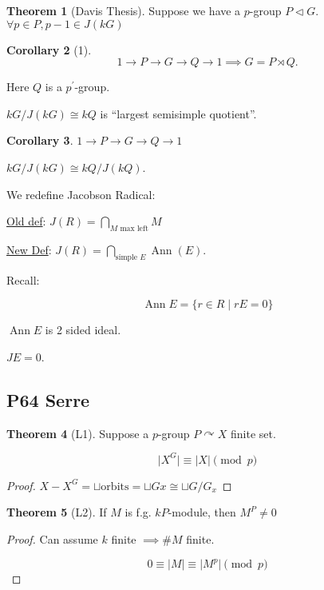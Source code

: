 \documentclass{article}
\theoremstyle{definition}
\newtheorem{theorem}{Theorem}
\newtheorem{corollary}[theorem]{Corollary}
\newcommand{\acts}{\curvearrowright}
\begin{document}
\begin{theorem}
    [Davis Thesis] Suppose we have a \(p\)-group \(P \triangleleft G\). \(\forall p\in P, p-1 \in J(kG)\)
\end{theorem}

\begin{corollary}
    [1]

    \[
        1 \to P \to G \to Q \to 1 \implies G = P \rtimes Q.
    \]

    Here \(Q\) is a \(p^{\prime}\)-group.

    \(kG / J(kG) \cong kQ\) is ``largest semisimple quotient''.
\end{corollary}

\begin{corollary}
    \(1 \to P \to G \to Q \to 1\) 

    \(kG / J(kG) \cong kQ / J(kQ)\).
\end{corollary}

We redefine Jacobson Radical:

\underline{Old def}: \(J(R) = \bigcap_{M \text{ max left} }^{} M\) 

\underline{New Def}: \(J(R) = \bigcap_{\text{simple } E}^{} \operatorname{Ann} (E)\).

Recall:

\[
    \operatorname{Ann} E = \{ r\in R \mid rE = 0 \} 
\]

\(\operatorname{Ann} E\) is 2 sided ideal.

\(JE = 0\).

\subsection*{P64 Serre}

\begin{theorem}
    [L1] Suppose a \(p\)-group \(P \acts X\) finite set.

    \[
        \vert X^G \vert \equiv \vert X \vert \pmod{p}
    \]
\end{theorem}

\begin{proof}
    \(X - X^G = \sqcup \text{orbits} = \sqcup G x \cong \sqcup G / G_x \) 
\end{proof}

\begin{theorem}
    [L2] If \(M\) is f.g. \(kP\)-module, then \(M^P \neq 0\)
\end{theorem}

\begin{proof}
    Can assume \(k\) finite \(\implies \# M\) finite.

    \[
        0 \equiv \vert M \vert \equiv \vert M^p \vert \pmod{p}
    \]
\end{proof}
\end{document}
